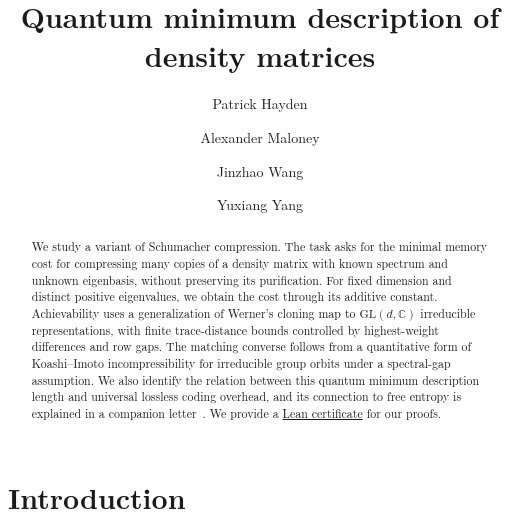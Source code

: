 \documentclass[a4paper,onecolumn,11pt]{quantumarticle}
\begin{document}
\title{Quantum minimum description of density matrices}

\author{Patrick Hayden}

\author{Alexander Maloney}

\author{Jinzhao Wang}

\author{Yuxiang Yang}
 
\date{}
\maketitle

\begin{abstract}
We study a variant of Schumacher compression. The task asks for the minimal memory cost for compressing many copies of a density matrix with known spectrum and unknown eigenbasis, without preserving its purification. For fixed dimension and distinct positive eigenvalues, we obtain the cost through its additive constant. Achievability uses a generalization of Werner's cloning map to $\mathrm{GL}(d,\mathbb C)$ irreducible representations, with finite trace-distance bounds controlled by highest-weight differences and row gaps. The matching converse follows from a quantitative form of Koashi--Imoto incompressibility for irreducible group orbits under a spectral-gap assumption. We also identify the relation between this quantum minimum description length and universal lossless coding overhead, and its connection to free entropy is explained in a companion letter~\cite{paper1}. We provide a \href{https://github.com/JWang226/Quantum-Minimum-Description-Length}{Lean certificate} for our proofs. 
\end{abstract}


\section{Introduction}\label{sec:intro}
\end{document}
